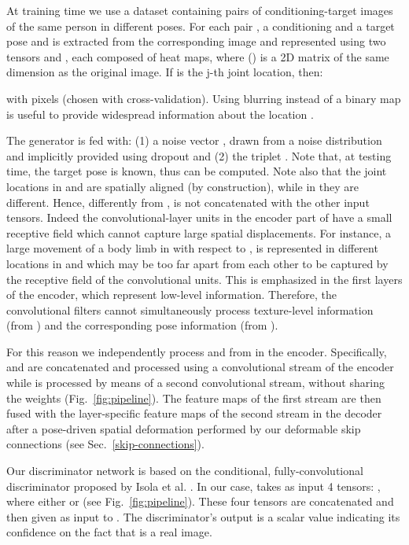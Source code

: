 \documentclass[10pt,twocolumn,letterpaper]{article}
\begin{document}
At training time we use a dataset   containing pairs of conditioning-target images of the same person in different poses.
For each pair , a conditioning and a target pose  and  is extracted from the corresponding image and represented using two  tensors  and , each composed of  heat maps, where   () is a 2D matrix of the same dimension as the original image. If  is the j-th joint location, then:



\noindent
with  pixels (chosen with cross-validation).
Using
 blurring instead of a binary map is useful to provide widespread information about the location .

The generator  is fed with: (1) a noise vector , 
 drawn from a noise distribution  and implicitly provided using dropout \cite{pix2pix2016} 
and (2) the triplet . Note that, at testing time, the target pose is known, thus  can be computed.
Note also that the joint locations in  and   are spatially aligned (by construction), while in  they are different.
Hence, differently from \cite{ma2017pose,pix2pix2016},  is not concatenated with the other input tensors. Indeed the convolutional-layer units in the encoder part of  have a small receptive field which cannot capture large spatial displacements. For instance, a large movement of a body limb in  with respect to , is represented in different locations in  and  which may be too far apart  from each other to be captured by the receptive field of the convolutional  units. This is emphasized in the first layers of the encoder, which represent low-level information. Therefore, the convolutional filters cannot simultaneously process texture-level information (from ) and the corresponding pose information (from ).

For this reason we independently process   and  from  in the encoder. 
Specifically,  and  are concatenated and processed
using a convolutional stream of the encoder while   is processed by means of  a second convolutional stream,  without sharing the weights 
(Fig.~\ref{fig:pipeline}).
The feature maps of the first stream are then fused with the layer-specific  feature maps of the second stream in the decoder  after a pose-driven spatial deformation performed by our deformable skip connections (see Sec.~\ref{skip-connections}).

Our discriminator network is based on the conditional, fully-convolutional 
discriminator proposed by
Isola et al. \cite{pix2pix2016}. In our case,  takes as input 4 tensors: , where either   or  (see Fig.~\ref{fig:pipeline}).
These four tensors are concatenated  and then given as input to . The  discriminator's output is a  scalar value indicating its confidence on the fact that   is a real image.
\end{document}
